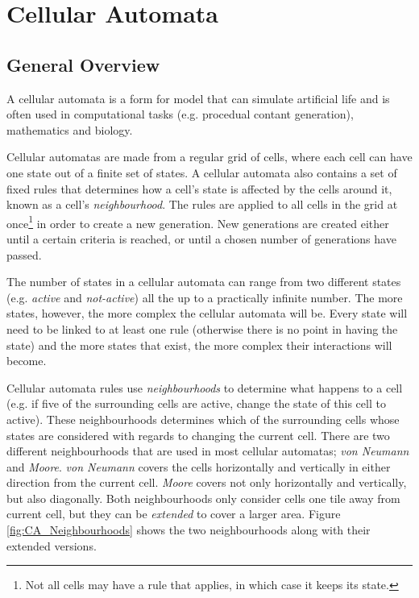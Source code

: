 \section{Cellular Automata}
\label{methodology_ca}

\subsection{General Overview}
\label{methodology_ca_overview}

A cellular automata is a form for model that can simulate artificial life and is often used in computational tasks (e.g. procedual contant generation\cite{togelius2011search}), mathematics and biology. 

Cellular automatas are made from a regular grid of cells, where each cell can have one state out of a finite set of states. A cellular automata also contains a set of fixed rules that determines how a cell's state is affected by the cells around it, known as a cell's \textit{neighbourhood}. The rules are applied to all cells in the grid at once\footnote{Not all cells may have a rule that applies, in which case it keeps its state.} in order to create a new generation. New generations are created either until a certain criteria is reached, or until a chosen number of generations have passed.

The number of states in a cellular automata can range from two different states (e.g. \textit{active} and \textit{not-active}) all the up to a practically infinite number. The more states, however, the more complex the cellular automata will be. Every state will need to be linked to at least one rule (otherwise there is no point in having the state) and the more states that exist, the more complex their interactions will become.

Cellular automata rules use \textit{neighbourhoods} to determine what happens to a cell (e.g. if five of the surrounding cells are active, change the state of this cell to active). These neighbourhoods determines which of the surrounding cells whose states are considered with regards to changing the current cell. There are two different neighbourhoods that are used in most cellular automatas; \textit{von Neumann} and \textit{Moore}. \textit{von Neumann} covers the cells horizontally and vertically in either direction from the current cell. \textit{Moore} covers not only horizontally and vertically, but also diagonally. Both neighbourhoods only consider cells one tile away from current cell, but they can be \textit{extended} to cover a larger area. Figure \ref{fig:CA_Neighbourhoods} shows the two neighbourhoods along with their extended versions.

